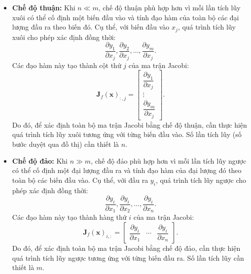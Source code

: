\begin{itemize}
    \item \textbf{Chế độ thuận:} Khi $n \ll m$, chế độ thuận phù hợp hơn vì mỗi lần tích lũy xuôi có thể cố định một biến đầu vào và tính đạo hàm của toàn bộ các đại lượng đầu ra theo biến đó. Cụ thể, với biến đầu vào $x_j$, quá trình tích lũy xuôi cho phép xác định đồng thời:
    \begin{equation}
    \frac{\partial y_1}{\partial x_j}, \frac{\partial y_2}{\partial x_j}, \dots, \frac{\partial y_m}{\partial x_j}.
    \end{equation}
    Các đạo hàm này tạo thành cột thứ $j$ của ma trận Jacobi:
    \begin{equation}
    \mathbf{J}_f(\mathbf{x})_{:,j} = 
    \begin{bmatrix}
    \dfrac{\partial y_1}{\partial x_j} \\
    \vdots \\
    \dfrac{\partial y_m}{\partial x_j}
    \end{bmatrix}.
    \end{equation}
    Do đó, để xác định toàn bộ ma trận Jacobi bằng chế độ thuận, cần thực hiện quá trình tích lũy xuôi tương ứng với từng biến đầu vào. Số lần tích lũy (số bước duyệt qua đồ thị) cần thiết là $n$.

    \item \textbf{Chế độ đảo:} Khi $n \gg m$, chế độ đảo phù hợp hơn vì mỗi lần tích lũy ngược có thể cố định một đại lượng đầu ra và tính đạo hàm của đại lượng đó theo toàn bộ các biến đầu vào. Cụ thể, với đầu ra $y_i$, quá trình tích lũy ngược cho phép xác định đồng thời:
    \begin{equation}
    \frac{\partial y_i}{\partial x_1}, \frac{\partial y_i}{\partial x_2}, \dots, \frac{\partial y_i}{\partial x_n}.
    \end{equation}
    Các đạo hàm này tạo thành hàng thứ $i$ của ma trận Jacobi:
    \begin{equation}
    \mathbf{J}_f(\mathbf{x})_{i,:} = 
    \begin{bmatrix}
    \dfrac{\partial y_i}{\partial x_1} & \cdots & \dfrac{\partial y_i}{\partial x_n}
    \end{bmatrix}.
    \end{equation}
    Do đó, để xác định toàn bộ ma trận Jacobi bằng chế độ đảo, cần thực hiện quá trình tích lũy ngược tương ứng với từng biến đầu ra. Số lần tích lũy cần thiết là $m$.
\end{itemize}

